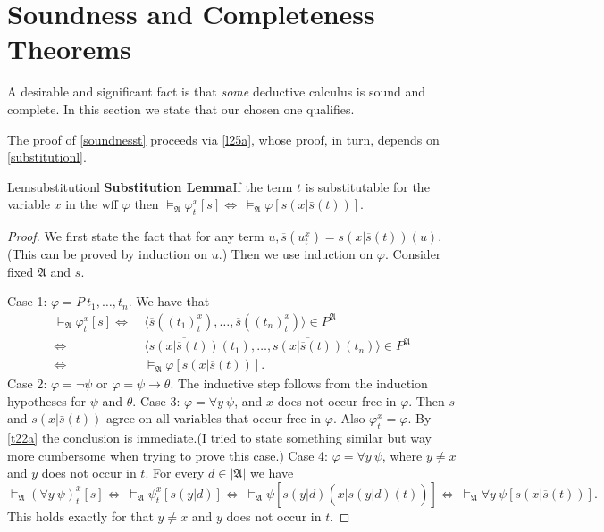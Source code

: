 \section{Soundness and Completeness Theorems}\label{sec:2.5}

A desirable and significant fact is that \textit{some} deductive calculus is sound and complete. In this section we state that our chosen one qualifies.

The proof of \ref{soundnesst} proceeds via \ref{l25a}, whose proof, in turn, depends on \ref{substitutionl}.

\begin{reference}{Lem}{substitutionl}
  \textbf{Substitution Lemma}\quad If the term $t$ is substitutable for the variable $x$ in the wff $\varphi$ then $\vDash_{\mathfrak{A}}\varphi_t^x[s]\Leftrightarrow\ \vDash_{\mathfrak{A}}\varphi[s(x|\bar{s}(t))].$
\end{reference}

\begin{proof}
  We first state the fact that for any term $u,\overline{s}(u_t^x)=\overline{s(x|\overline{s}(t))}(u).$ (This can be proved by induction on $u$.) Then we use induction on $\varphi$. Consider fixed $\mathfrak{A}$ and $s$.

  Case 1: $\varphi=P\ t_1,\dots,t_n.$ We have that
  \begin{align*}
    \vDash_{\mathfrak{A}}\varphi_t^x[s]\Leftrightarrow & \ \langle \overline{s}((t_1)_t^x),\dots,\overline{s}((t_n)_t^x)\rangle\in P^{\mathfrak{A}} \\ \Leftrightarrow& \ \langle\overline{s(x|\overline{s}(t))}(t_1),\dots,\overline{s(x|\overline{s}(t))}(t_n)\rangle\in P^{\mathfrak{A}}\\ \Leftrightarrow& \ \vDash_{\mathfrak{A}}\varphi[s(x|\overline{s}(t))].
  \end{align*}
  Case 2: $\varphi=\neg \psi$ or $\varphi=\psi\rightarrow \theta$. The inductive step follows from the induction hypotheses for $\psi$ and $\theta$.\newline
  Case 3: $\varphi=\forall y\ \psi$, and $x$ does not occur free in $\varphi$. Then $s$ and $s(x|\bar{s}(t))$ agree on all variables that occur free in $\varphi$. Also $\varphi_t^x=\varphi$. By \ref{t22a} the conclusion is immediate.(I tried to state something similar but way more cumbersome when trying to prove this case.)\newline
  Case 4: $\varphi=\forall y\ \psi$, where $y\neq x$ and $y$ does not occur in $t$. For every $d\in|\mathfrak{A}|$ we have
  \[
    \vDash_{\mathfrak{A}}(\forall y\ \psi)_t^x[s]\Leftrightarrow\ \vDash_{\mathfrak{A}}\psi_t^x[s(y|d)]\Leftrightarrow\ \vDash_{\mathfrak{A}}\psi[s(y|d)(x|\overline{s(y|d)}(t))]\Leftrightarrow\ \vDash_{\mathfrak{A}}\forall y\ \psi[s(x|\overline{s}(t))].
  \]
  This holds exactly for that $y\neq x$ and $y$ does not occur in $t$.
\end{proof}

